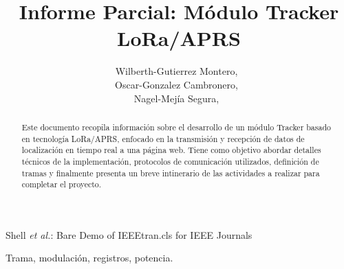 \documentclass[journal]{IEEEtran}
\begin{document}
%
\title{Informe Parcial: Módulo Tracker LoRa/APRS}

\author{Wilberth-Gutierrez Montero,~ \\
        Oscar-Gonzalez Cambronero,~ \\
        Nagel-Mejía Segura,~
}

%
{Shell \MakeLowercase{\textit{et al.}}: Bare Demo of IEEEtran.cls for IEEE Journals}





\maketitle

\begin{abstract}

Este documento recopila información sobre el desarrollo de un módulo Tracker basado en tecnología LoRa/APRS, enfocado en la transmisión y recepción de datos de localización en tiempo real a una página web. Tiene como objetivo abordar detalles técnicos de la implementación, protocolos de comunicación utilizados, definición de tramas y finalmente presenta un breve intinerario de las actividades a realizar para completar el proyecto.

\end{abstract}

\begin{IEEEkeywords}
Trama, modulación, registros, potencia.
\end{IEEEkeywords}


\IEEEpeerreviewmaketitle
\end{document}
